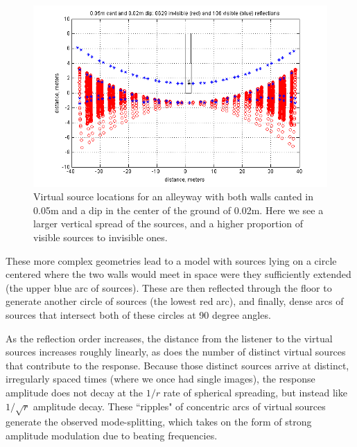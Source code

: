 \documentclass{aes137}
\begin{document}
\begin{figure}[h!] \centering \includegraphics[width=\linewidth, trim=13mm 2mm 10mm 3mm, clip]{images/ISM_0pt05m_cant_0pt02m_dip.png} 
\caption{Virtual source locations for an alleyway with both walls canted in 0.05m and a dip in the center of the ground of 0.02m. Here we see a larger vertical spread of the sources, and a higher proportion of visible sources to invisible ones.} 
\end{figure}

These more complex geometries lead to a model with sources lying on a
circle centered where the two walls would meet in space were they
sufficiently extended (the upper blue arc of sources). These are then reflected through the floor to generate another circle of sources (the lowest red arc), and finally, dense arcs of sources that intersect
both of these circles at 90 degree angles.

As the reflection order increases, the distance from the listener to the virtual sources increases roughly linearly, as does the number of distinct virtual sources that contribute to the response. Because those distinct sources arrive at distinct, irregularly spaced times (where we once had single images), the response amplitude does not decay at the $1/r$ rate of spherical spreading, but instead like $1/\sqrt{r}$ amplitude decay. %
These ``ripples" of concentric arcs of virtual sources generate the observed mode-splitting, which takes on the form of strong amplitude modulation due to beating frequencies.


\end{document}
